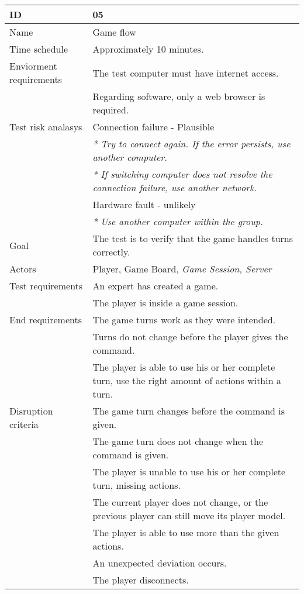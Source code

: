 {\footnotesize
\begin{table}[H]
\begin{tabular}{| p{5cm} | p{10cm} |}\hline
	\textbf{ID}	& \textbf{05} \\ \hline
	Name		& Game flow\\ \hline
	Time schedule	& Approximately 10 minutes.\\ \hline
	Enviorment requirements 
		& The test computer must have internet access. \\
		& Regarding software, only a web browser is required. \\ \hline
	Test risk analasys 
		& Connection failure - Plausible \\
		& \emph{* Try to connect again. If the error persists, use another computer.} \\
		& \emph{* If switching computer does not resolve the connection failure, use another network.}\\ 
		& Hardware fault - unlikely \\
		& \emph{* Use another computer within the group.} \\ \hline
	Goal	& The test is to verify that the game handles turns correctly. \\ \hline
	Actors	& Player, Game Board, \emph{Game Session, Server} \\ \hline
	Test requirements
		& An expert has created a game.\\
		& The player is inside a game session.\\ \hline
	End requirements 
		& The game turns work as they were intended. \\
		& Turns do not change before the player gives the command. \\
		& The player is able to use his or her complete turn, use the right amount of actions within a turn.\\ \hline
	Disruption criteria 
		& The game turn changes before the command is given. \\
		& The game turn does not change when the command is given. \\
		& The player is unable to use his or her complete turn, missing actions. \\
		& The current player does not change, or the previous player can still move its player model. \\
		& The player is able to use more than the given actions. \\
		& An unexpected deviation occurs.  \\
		& The player disconnects. \\ \hline

\end{tabular}
\end{table}}
